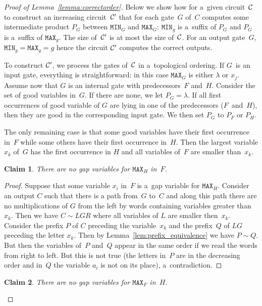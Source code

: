 \documentclass[11pt,letterpaper]{article}
\newtheorem{claim}{Claim}
\newcommand{\mmin}{\texttt{MIN}}
\newcommand{\mmax}{\texttt{MAX}}
\begin{document}
\begin{proof}[Proof of Lemma~\ref{lemma:correctorder}]
Below we show how for a~given circuit~${\cal C}$ to construct an increasing circuit~${\cal C}'$ that for each gate~$G$ of~$C$ computes some intermediate product $P_G$ between $\mmin_G$ and $\mmax_G$: $\mmin_g$ is a~suffix of $P_G$ and $P_G$ is a~suffix of $\mmax_g$. The size of~${\cal C}'$ is at most the size of~${\cal C}$. For an output gate~$G$, $\mmin_g=\mmax_g=g$ hence the circuit ${\cal C}'$ computes the correct outputs.

To construct ${\cal C}'$, we process the gates of~${\cal C}$ in a~topological ordering. If $G$~is an input gate, everything is straightforward: in this case $\mmax_G$ is either $\lambda$ or $x_j$. Assume now that $G$ is an internal gate with predecessors~$F$ and~$H$. 
Consider the set of good variables in~$G$. If there are none, we let $P_G=\lambda$. If all first occurrences of good variable of $G$ are lying in one of the predecessors ($F$~and~$H$), then they are good in the corresponding input gate. We then set $P_G$ to $P_F$ or $P_H$.

The only remaining case is that some good variables have their first occurrence in~$F$ while some others have their first occurrence in~$H$. Then the largest variable $x_k$ of~$G$ has the first occurrence in $H$ and all variables of~$F$ are smaller than~$x_k$.

\begin{claim} \label{cl: h is good}
There are no gap variables for $\mmax_H$ in~$F$.
\end{claim}

\begin{proof}
Suppose that some variable $x_i$ in~$F$ is a~gap variable for $\mmax_H$. Consider an output $C$ such that there is a path from~$G$ to~$C$ and along this path there are no multiplications of $G$ from the left by words containing variables greater than~$x_k$. Then we have $C \sim LGR$ where all variables of $L$ are smaller then~$x_k$. Consider the prefix $P$ of $C$ preceding the variable~$x_k$ and the prefix~$Q$ of $LG$ preceding the letter $x_k$.
Then by Lemma~\ref{lem:prefix_equivalence} we have $P \sim Q$. But then the variables of~$P$ and~$Q$ appear in the same order if we read the words from right to left. But this is not true (the letters in~$P$ are in the decreasing order and in~$Q$ the variable $a_i$ is not on its place), a~contradiction.
\end{proof}

\begin{claim}\label{cl: f is good}
There are no gap variables for $\mmax_F$ in~$H$.
\end{claim}


\end{proof}
\end{document}
